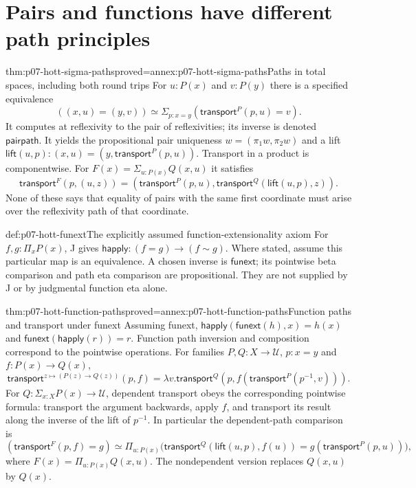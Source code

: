\section{Pairs and functions have different path principles}
\label{sec:p07-hott-type-formers}

\begin{hbtheorem}{thm:p07-hott-sigma-paths}{proved=annex:p07-hott-sigma-paths}{Paths in total spaces, including both round trips}
For $u:P(x)$ and $v:P(y)$ there is a specified equivalence
\[
 ((x,u)=(y,v))\simeq
 \Sigma_{p:x=y}(\mathsf{transport}^{P}(p,u)=v).
\]
It computes at reflexivity to the pair of reflexivities; its inverse is
denoted $\mathsf{pairpath}$. It yields the propositional pair uniqueness
$w=(\pi_1w,\pi_2w)$ and a lift
$\mathsf{lift}(u,p):(x,u)=(y,\mathsf{transport}^{P}(p,u))$.
Transport in a product is componentwise. For
$F(x)=\Sigma_{u:P(x)}Q(x,u)$ it satisfies
\[
 \mathsf{transport}^{F}(p,(u,z))=
 (\mathsf{transport}^{P}(p,u),
       \mathsf{transport}^{Q}(\mathsf{lift}(u,p),z)).
\]
None of these says that equality of pairs with the same first coordinate
must arise over the reflexivity path of that coordinate.
\end{hbtheorem}

\begin{hbdefinition}{def:p07-hott-funext}{The explicitly assumed function-extensionality axiom}
For $f,g:\Pi_xP(x)$, J gives
$\mathsf{happly}:(f=g)\to(f\sim g)$. Where stated, assume this particular
map is an equivalence. A chosen inverse is $\mathsf{funext}$; its
pointwise beta comparison and path eta comparison are propositional.
They are not supplied by J or by judgmental function eta alone.
\end{hbdefinition}

\begin{hbtheorem}{thm:p07-hott-function-paths}{proved=annex:p07-hott-function-paths}{Function paths and transport under funext}
Assuming funext, $\mathsf{happly}(\mathsf{funext}(h),x)=h(x)$ and
$\mathsf{funext}(\mathsf{happly}(r))=r$. Function path inversion and
composition correspond to the pointwise operations.
For families $P,Q:X\to\mathcal U$, $p:x=y$ and $f:P(x)\to Q(x)$,
\[
 \mathsf{transport}^{z\mapsto(P(z)\to Q(z))}(p,f)
 =\lambda v.\mathsf{transport}^{Q}
            (p,f(\mathsf{transport}^{P}(p^{-1},v))).
\]
For $Q:\Sigma_{x:X}P(x)\to\mathcal U$, dependent transport obeys
the corresponding pointwise formula: transport the argument backwards,
apply $f$, and transport its result along the inverse of the lift of
$p^{-1}$. In particular the dependent-path comparison is
\[
 (\mathsf{transport}^{F}(p,f)=g)\simeq
 \Pi_{u:P(x)}\bigl(
 \mathsf{transport}^{Q}(\mathsf{lift}(u,p),f(u))
                  =g(\mathsf{transport}^{P}(p,u))\bigr),
\]
where $F(x)=\Pi_{u:P(x)}Q(x,u)$. The nondependent version replaces
$Q(x,u)$ by $Q(x)$.
\end{hbtheorem}

